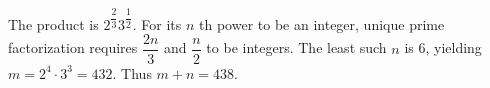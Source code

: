 The product is $2^{\dfrac{2}{3}}3^{\dfrac{1}{2}}$. For its $n$ th power to be an integer, unique prime factorization requires $\dfrac{2n}{3}$ and $\dfrac{n}{2}$ to be integers. The least such $n$ is 6, yielding $m=2^4\cdot3^3=432$. Thus $\boxed{m+n=438}$.
